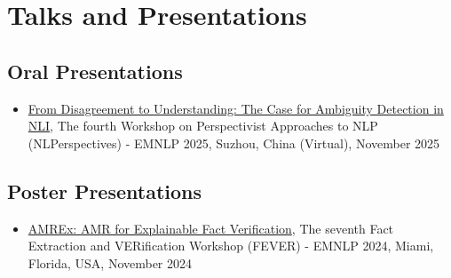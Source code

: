 \section*{Talks and Presentations}

\subsection*{Oral Presentations \hspace{6.2in}}

\begin{itemize}
    \item \href{https://underline.io/lecture/136995-from-disagreement-to-understanding-the-case-for-ambiguity-detection-in-nli}{From Disagreement to Understanding: The Case for Ambiguity Detection in NLI}, The fourth Workshop on Perspectivist Approaches to NLP (NLPerspectives) - EMNLP 2025, Suzhou, China (Virtual), November 2025
\end{itemize}

\subsection*{Poster Presentations \hspace{6.2in}}

\begin{itemize}
    \item \href{https://underline.io/lecture/107030-amrex-amr-for-explainable-fact-verification}{AMREx: AMR for Explainable Fact Verification}, The seventh Fact Extraction and VERification Workshop (FEVER) - EMNLP 2024, Miami, Florida, USA, November 2024
\end{itemize}

